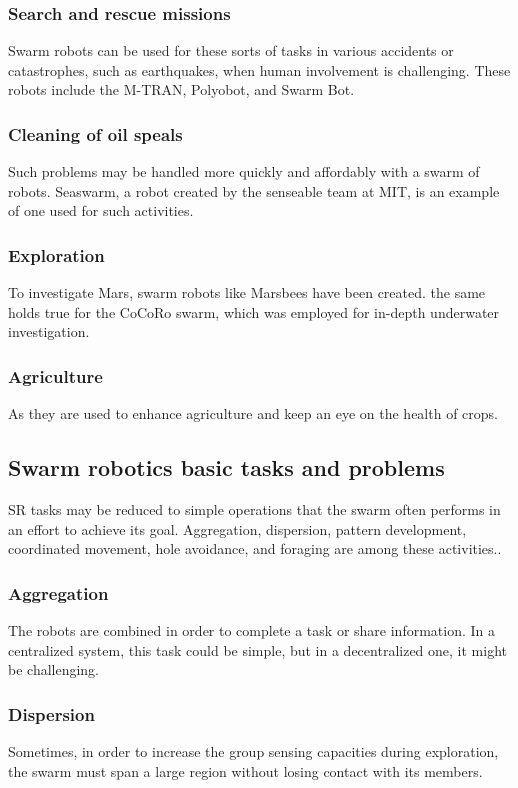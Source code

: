 \documentclass[12pt]{extarticle}
\begin{document}
\subsubsection{Search and rescue missions}
Swarm robots can be used for these sorts of tasks in various accidents or catastrophes, such as earthquakes, when human involvement is challenging. These robots include the M-TRAN, Polyobot, and Swarm Bot.

\subsubsection{Cleaning of oil speals}
Such problems may be handled more quickly and affordably with a swarm of robots. Seaswarm, a robot created by the senseable team at MIT, is an example of one used for such activities.

\subsubsection{Exploration}
To investigate Mars, swarm robots like Marsbees have been created. the same holds true for the CoCoRo swarm, which was employed for in-depth underwater investigation.
\subsubsection{Agriculture}
As they are  used to enhance agriculture and keep an eye on the health of crops. 

\subsection{Swarm robotics basic tasks and problems}
SR tasks may be reduced to simple operations that the swarm often performs in an effort to achieve its goal.
Aggregation, dispersion, pattern development, coordinated movement, hole avoidance, and foraging are among these activities.\cite{bayindir2007review}\cite{navarro2013introduction}.

\subsubsection{Aggregation}
The robots are combined in order to complete a task or share information. In a centralized system, this task could be simple, but in a decentralized one, it might be challenging.
\subsubsection{Dispersion}
Sometimes, in order to increase the group sensing capacities during exploration, the swarm must span a large region without losing contact with its members. 
\end{document}
